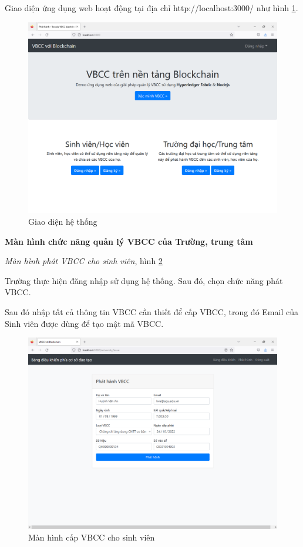 Giao diện ứng dụng web hoạt động tại địa chỉ http://localhost:3000/ như hình \ref{fig:main_vbcc}. 

\begin{figure}[H]
\centering
\includegraphics[width=.9\linewidth]{img/main_vbcc.png}
\caption{Giao diện hệ thống}
\label{fig:main_vbcc}
\end{figure}

\textbf{Màn hình chức năng quản lý VBCC của Trường, trung tâm}

\emph{Màn hình phát VBCC cho sinh viên}, hình \ref{fig:tt_phathanh}

Trường thực hiện đăng nhập sử dụng hệ thống. Sau đó, chọn chức năng phát VBCC. 

Sau đó nhập tất cả thông tin VBCC cần thiết để cấp VBCC, trong đó Email của Sinh viên được dùng để tạo mật mã VBCC.

\begin{figure}[H]
\centering
\includegraphics[width=.9\linewidth]{img/tt_phathanh.PNG}
\caption{Màn hình cấp VBCC cho sinh viên}
\label{fig:tt_phathanh}
\end{figure}

